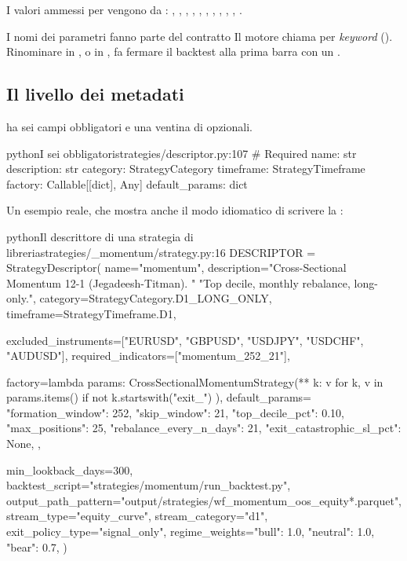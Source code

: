 \noindent
I valori ammessi per  vengono da :
, , , ,
, , , ,
, , .

\begin{attenzione}{I nomi dei parametri fanno parte del contratto}
Il motore chiama  per \emph{keyword}
(). Rinominare  in , o
 in , fa fermare il backtest alla prima
barra con un .
\end{attenzione}

\subsection{Il livello dei metadati}

 ha sei campi obbligatori e una ventina di
opzionali.

\begin{codiceInterno}{python}{I sei obbligatori}{strategies/descriptor.py:107}
    # Required
    name: str
    description: str
    category: StrategyCategory
    timeframe: StrategyTimeframe
    factory: Callable[[dict], Any]
    default_params: dict
\end{codiceInterno}

\noindent
Un esempio reale, che mostra anche il modo idiomatico di scrivere la
:

\begin{codiceInterno}{python}{Il descrittore di una strategia di libreria}{strategies/\_momentum/strategy.py:16}
DESCRIPTOR = StrategyDescriptor(
    name="momentum",
    description="Cross-Sectional Momentum 12-1 (Jegadeesh-Titman). "
                "Top decile, monthly rebalance, long-only.",
    category=StrategyCategory.D1_LONG_ONLY,
    timeframe=StrategyTimeframe.D1,

    excluded_instruments=["EURUSD", "GBPUSD", "USDJPY", "USDCHF", "AUDUSD"],
    required_indicators=["momentum_252_21"],

    factory=lambda params: CrossSectionalMomentumStrategy(**{
        k: v for k, v in params.items() if not k.startswith("exit_")
    }),
    default_params={
        "formation_window": 252,
        "skip_window": 21,
        "top_decile_pct": 0.10,
        "max_positions": 25,
        "rebalance_every_n_days": 21,
        "exit_catastrophic_sl_pct": None,
    },

    min_lookback_days=300,
    backtest_script="strategies/momentum/run_backtest.py",
    output_path_pattern="output/strategies/wf_momentum_oos_equity*.parquet",
    stream_type="equity_curve",
    stream_category="d1",
    exit_policy_type="signal_only",
    regime_weights={"bull": 1.0, "neutral": 1.0, "bear": 0.7},
)
\end{codiceInterno}

